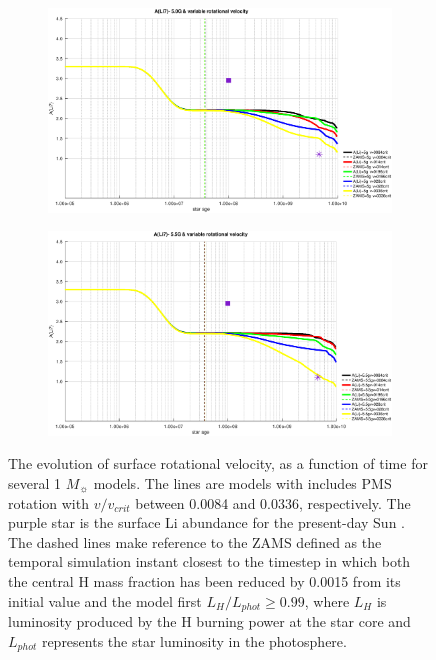 \documentclass[fleqn,usenatbib]{mnras}
\begin{document}
\begin{figure}
    \begin{subfigure}[h]{0.47\textwidth}
    \includegraphics[width=\textwidth]{figures/li_var_vel_5_0g.eps}
    \label{fig:subim5}
    \end{subfigure}
    \begin{subfigure}[h]{0.47\textwidth}
    \includegraphics[width=\textwidth]{figures/li_var_vel_5_5g.eps}
    \label{fig:subim6}
    \end{subfigure}
\caption{The evolution of surface rotational velocity, as a function of time for several 1 $M_{\sun}$ models. The lines are models with includes PMS rotation with $v/v_{crit}$ between 0.0084 and 0.0336, respectively. The purple star is the surface Li abundance for the present-day Sun \citep{Asplund2009}. The dashed lines make reference to the ZAMS defined as the temporal simulation instant closest to the timestep in which both the central H mass fraction has been reduced by 0.0015 from its initial value and the model first $L_H/L_{phot} \geq 0.99$, where $L_{H}$ is luminosity produced by the H burning power at the star core and $L_{phot}$ represents the star luminosity in the photosphere.}
\label{fig:image2}
\end{figure}
\par
\end{document}
